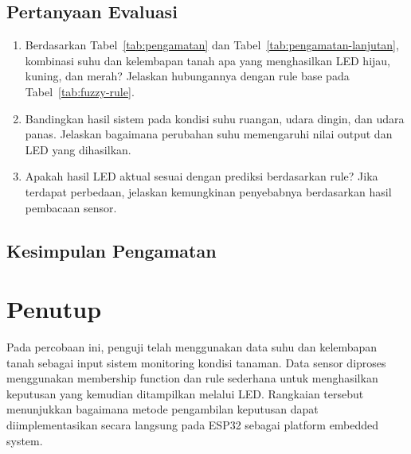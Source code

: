 \documentclass[12pt,a4paper]{article}
\begin{document}
\subsection*{Pertanyaan Evaluasi}

\begin{enumerate}
    \item Berdasarkan Tabel~\ref{tab:pengamatan} dan Tabel~\ref{tab:pengamatan-lanjutan}, kombinasi suhu dan kelembapan tanah apa yang menghasilkan LED hijau, kuning, dan merah? Jelaskan hubungannya dengan rule base pada Tabel~\ref{tab:fuzzy-rule}.

    \item Bandingkan hasil sistem pada kondisi suhu ruangan, udara dingin, dan udara panas. Jelaskan bagaimana perubahan suhu memengaruhi nilai output dan LED yang dihasilkan.

    \item Apakah hasil LED aktual sesuai dengan prediksi berdasarkan rule? Jika terdapat perbedaan, jelaskan kemungkinan penyebabnya berdasarkan hasil pembacaan sensor.
\end{enumerate}

\subsection*{Kesimpulan Pengamatan}

\noindent
\makebox[\textwidth]{\hrulefill}

\vspace{0.4cm}

\noindent
\makebox[\textwidth]{\hrulefill}

\vspace{0.4cm}

\noindent
\makebox[\textwidth]{\hrulefill}

\section{Penutup}

Pada percobaan ini, penguji telah menggunakan data suhu dan kelembapan tanah sebagai input sistem monitoring kondisi tanaman. Data sensor diproses menggunakan membership function dan rule sederhana untuk menghasilkan keputusan yang kemudian ditampilkan melalui LED. Rangkaian tersebut menunjukkan bagaimana metode pengambilan keputusan dapat diimplementasikan secara langsung pada ESP32 sebagai platform embedded system.
\end{document}
